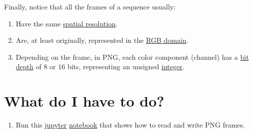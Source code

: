 
Finally, notice that all the frames of a sequence usually:
\begin{enumerate}
\item Have the same
  \href{https://en.wikipedia.org/wiki/Image_resolution}{spatial
    resolution}.
\item Are, at least originally, represented in the
  \href{https://en.wikipedia.org/wiki/RGB_color_model}{RGB domain}.
\item Depending on the frame, in PNG, each color component (channel) has a
  \href{https://en.wikipedia.org/wiki/Glossary_of_computer_graphics#bit_depth}{bit
    depth} of $8$ or $16$ bits, representing an unsigned
  \href{https://en.wikipedia.org/wiki/Integer_(computer_science)}{integer}.
\end{enumerate}
  
\section{What do I have to do?}

\begin{enumerate}
\item Run this \href{https://jupyter.org/}{jupyter}
  \href{https://github.com/Sistemas-Multimedia/Sistemas-Multimedia.github.io/blob/master/contents/PNG/display_video.ipynb}{notebook}
  that shows how to read and write PNG frames.
\end{enumerate}

